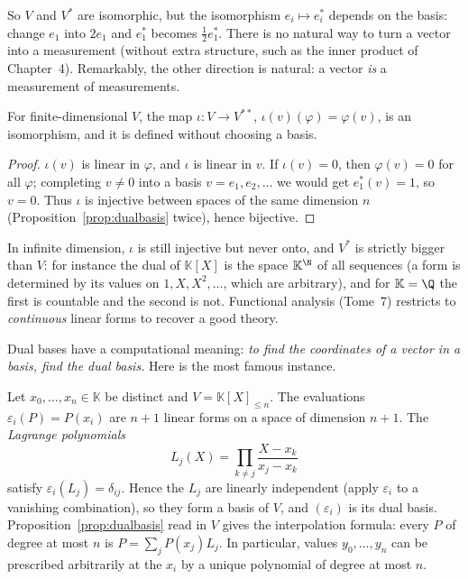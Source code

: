 So $V$ and $V^*$ are isomorphic, but the isomorphism $e_i\mapsto e_i^*$ depends on the basis: change $e_1$ into $2e_1$
and $e_1^*$ becomes $\tfrac12e_1^*$. There is no natural way to turn a vector into a measurement (without extra
structure, such as the inner product of Chapter~4). Remarkably, the other direction is natural: a vector \emph{is} a
measurement of measurements.

\begin{theorem}\label{thm:bidual}
For finite-dimensional $V$, the map $\iota:V\to V^{**}$, $\iota(v)(\varphi)=\varphi(v)$, is an isomorphism, and it is
defined without choosing a basis.
\end{theorem}
\begin{proof}
$\iota(v)$ is linear in $\varphi$, and $\iota$ is linear in $v$. If $\iota(v)=0$, then $\varphi(v)=0$ for all
$\varphi$; completing $v\ne0$ into a basis $v=e_1,e_2,\dots$ we would get $e_1^*(v)=1$, so $v=0$. Thus $\iota$ is
injective between spaces of the same dimension $n$ (Proposition~\ref{prop:dualbasis} twice), hence bijective.
\end{proof}

\begin{remark}
In infinite dimension, $\iota$ is still injective but never onto, and $V^*$ is strictly bigger than $V$: for instance the
dual of $\mathbb K[X]$ is the space $\mathbb K^{\N}$ of all sequences (a form is determined by its values on
$1,X,X^2,\dots$, which are arbitrary), and for $\mathbb K=\Q$ the first is countable and the second is not. Functional
analysis (Tome~7) restricts to \emph{continuous} linear forms to recover a good theory.
\end{remark}

Dual bases have a computational meaning: \emph{to find the coordinates of a vector in a basis, find the dual basis.}
Here is the most famous instance.

\begin{example}\label{ex:lagrange}
Let $x_0,\dots,x_n\in\mathbb K$ be distinct and $V=\mathbb K[X]_{\le n}$. The evaluations $\varepsilon_i(P)=P(x_i)$ are
$n+1$ linear forms on a space of dimension $n+1$. The \emph{Lagrange polynomials}
\[
L_j(X)=\prod_{k\ne j}\frac{X-x_k}{x_j-x_k}
\]
satisfy $\varepsilon_i(L_j)=\delta_{ij}$. Hence the $L_j$ are linearly independent (apply $\varepsilon_i$ to a vanishing
combination), so they form a basis of $V$, and $(\varepsilon_i)$ is its dual basis. Proposition~\ref{prop:dualbasis}
read in $V$ gives the interpolation formula: every $P$ of degree at most $n$ is $P=\sum_jP(x_j)L_j$. In particular,
values $y_0,\dots,y_n$ can be prescribed arbitrarily at the $x_i$ by a unique polynomial of degree at most $n$.
\end{example}

